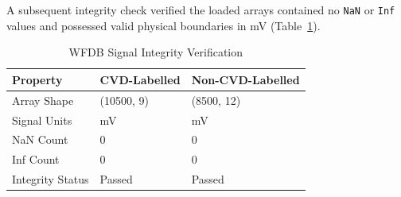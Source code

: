 \documentclass[11pt, a4paper]{article}
\begin{document}
\begin{table}[htbp]
    \centering
    \caption{Selected Record Metadata Verification}
    \label{tab:metadata_verification}
\end{table}

A subsequent integrity check verified the loaded arrays contained no \texttt{NaN} or \texttt{Inf} values and possessed valid physical boundaries in mV (Table~\ref{tab:signal_verification}).

\begin{table}[htbp]
    \centering
    \caption{WFDB Signal Integrity Verification}
    \begin{tabular}{lll}
        \toprule
        \textbf{Property} & \textbf{CVD-Labelled} & \textbf{Non-CVD-Labelled} \\
        \midrule
        Array Shape & (10500, 9) & (8500, 12) \\
        Signal Units & mV & mV \\
        NaN Count & 0 & 0 \\
        Inf Count & 0 & 0 \\
        Integrity Status & Passed & Passed \\
        \bottomrule
    \end{tabular}
    \label{tab:signal_verification}
\end{table}
\end{document}
